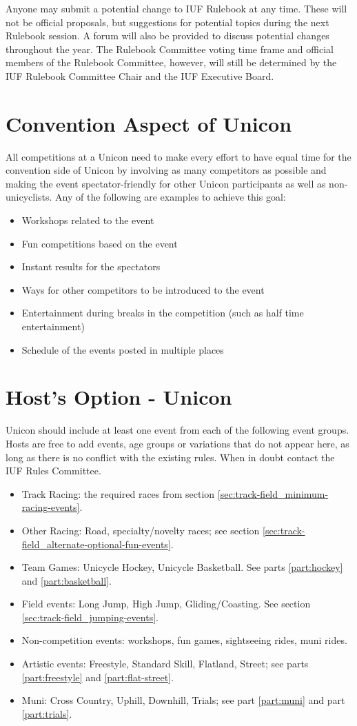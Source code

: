 Anyone may submit a potential change to IUF Rulebook at any time.
These will not be official proposals, but suggestions for potential topics during the next Rulebook session.
A forum will also be provided to discuss potential changes throughout the year.
The Rulebook Committee voting time frame and official members of the Rulebook Committee, however, will still be determined by the IUF Rulebook Committee Chair and the IUF Executive Board.

\section{Convention Aspect of Unicon}
All competitions at a Unicon need to make every effort to have equal time for the convention side of Unicon by involving as many competitors as possible and making the event spectator-friendly for other Unicon participants as well as non-unicyclists.
Any of the following are examples to achieve this goal:
\begin{itemize}
  \item Workshops related to the event
  \item Fun competitions based on the event
  \item Instant results for the spectators
  \item Ways for other competitors to be introduced to the event
  \item Entertainment during breaks in the competition (such as half time entertainment)
  \item Schedule of the events posted in multiple places
\end{itemize}

\section{Host's Option - Unicon}
Unicon should include at least one event from each of the following event groups. 
Hosts are free to add events, age groups or variations that do not appear here, as long as there is no conflict with the existing rules. 
When in doubt contact the IUF Rules Committee.
\begin{itemize}
  \item Track Racing: the required races from section \ref{sec:track-field_minimum-racing-events}.
  \item Other Racing: Road, specialty/novelty races; see section \ref{sec:track-field_alternate-optional-fun-events}.
  \item Team Games: Unicycle Hockey, Unicycle Basketball. See parts \ref{part:hockey} and \ref{part:basketball}.
  \item Field events: Long Jump, High Jump, Gliding/Coasting. See section \ref{sec:track-field_jumping-events}.
  \item Non-competition events: workshops, fun games, sightseeing rides, muni rides.
  \item Artistic events: Freestyle, Standard Skill, Flatland, Street; see parts \ref{part:freestyle} and \ref{part:flat-street}.
  \item Muni: Cross Country, Uphill, Downhill, Trials; see part \ref{part:muni} and part \ref{part:trials}.
\end{itemize}

